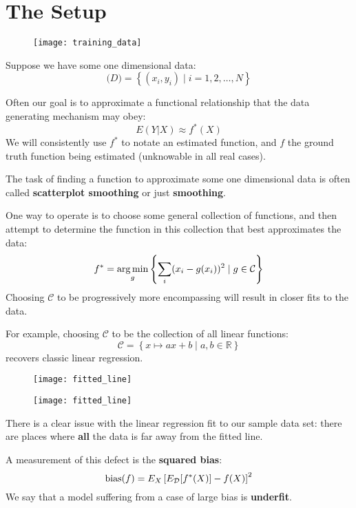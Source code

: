 \section{The Setup}
%
\begin{frame}
  \begin{figure}
    \texttt{[image: training\_data]}
  \end{figure}
  Suppose we have some one dimensional data:
  $$\mathcal(D) = \left\{ (x_i, y_i) \mid i = 1,2,\ldots,N \right\}$$
\end{frame}
%
\begin{frame}
  Often our goal is to approximate a functional relationship that the data generating mechanism may obey:
  $$E(Y|X) \approx f^*(X)$$
  We will consistently use $f^*$ to notate an estimated function, and $f$ the ground truth function being estimated (unknowable in all real cases).
\end{frame}
%
\begin{frame}
  The task of finding a function to approximate some one dimensional data is often called \textbf{scatterplot smoothing} or just \textbf{smoothing}.
\end{frame}
%
\begin{frame}
  One way to operate is to choose some general collection of functions, and then attempt to determine the function in this collection that best approximates the data:
  $$ f^* = \operatorname*{arg\,min}_{g} \left\{ \sum_i (x_i - g(x_i))^2 \mid g \in \mathcal{C} \right\} $$
  Choosing $\mathcal{C}$ to be progressively more encompassing will result in closer fits to the data.
\end{frame}
%
\begin{frame}
  For example, choosing $\mathcal{C}$ to be the collection of all linear functions:
  $$ \mathcal{C} = \left\{ x \mapsto ax + b \mid a,b \in \mathbb{R} \right\} $$
recovers classic linear regression.
  \begin{figure}
    \texttt{[image: fitted\_line]}
  \end{figure}
\end{frame}
%
\begin{frame}
  \begin{figure}
    \texttt{[image: fitted\_line]}
  \end{figure}
  There is a clear issue with the linear regression fit to our sample data set: there are places where \textbf{all} the data is far away from the fitted line.
\end{frame}
%
\begin{frame}
  A measurement of this defect is the \textbf{squared bias}:
  $$ \operatorname*{bias}(f) = E_X \left[ E_{\mathcal{D}}[f^*(X)] - f(X) \right] ^2$$
  We say that a model suffering from a case of large bias is \textbf{underfit}.
\end{frame}
